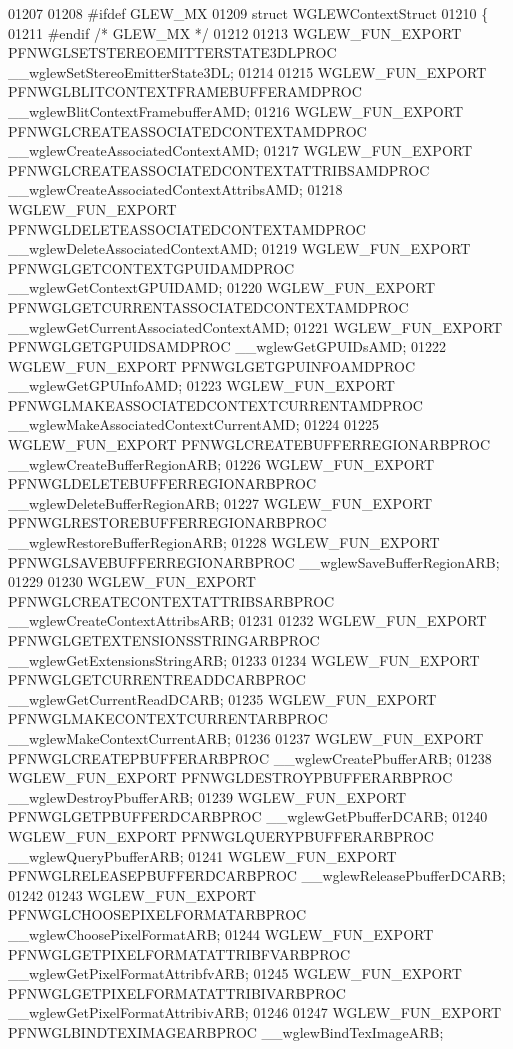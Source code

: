 \begin{DoxyCode}
01207 
01208 \textcolor{preprocessor}{#ifdef GLEW\_MX}
01209 \textcolor{keyword}{struct }WGLEWContextStruct
01210 \{
01211 \textcolor{preprocessor}{#endif }\textcolor{comment}{/* GLEW\_MX */}\textcolor{preprocessor}{}
01212 
01213 WGLEW_FUN_EXPORT PFNWGLSETSTEREOEMITTERSTATE3DLPROC 
      __wglewSetStereoEmitterState3DL;
01214 
01215 WGLEW_FUN_EXPORT PFNWGLBLITCONTEXTFRAMEBUFFERAMDPROC 
      __wglewBlitContextFramebufferAMD;
01216 WGLEW_FUN_EXPORT PFNWGLCREATEASSOCIATEDCONTEXTAMDPROC 
      __wglewCreateAssociatedContextAMD;
01217 WGLEW_FUN_EXPORT PFNWGLCREATEASSOCIATEDCONTEXTATTRIBSAMDPROC 
      __wglewCreateAssociatedContextAttribsAMD;
01218 WGLEW_FUN_EXPORT PFNWGLDELETEASSOCIATEDCONTEXTAMDPROC 
      __wglewDeleteAssociatedContextAMD;
01219 WGLEW_FUN_EXPORT PFNWGLGETCONTEXTGPUIDAMDPROC __wglewGetContextGPUIDAMD;
01220 WGLEW_FUN_EXPORT PFNWGLGETCURRENTASSOCIATEDCONTEXTAMDPROC 
      __wglewGetCurrentAssociatedContextAMD;
01221 WGLEW_FUN_EXPORT PFNWGLGETGPUIDSAMDPROC __wglewGetGPUIDsAMD;
01222 WGLEW_FUN_EXPORT PFNWGLGETGPUINFOAMDPROC __wglewGetGPUInfoAMD;
01223 WGLEW_FUN_EXPORT PFNWGLMAKEASSOCIATEDCONTEXTCURRENTAMDPROC 
      __wglewMakeAssociatedContextCurrentAMD;
01224 
01225 WGLEW_FUN_EXPORT PFNWGLCREATEBUFFERREGIONARBPROC __wglewCreateBufferRegionARB;
01226 WGLEW_FUN_EXPORT PFNWGLDELETEBUFFERREGIONARBPROC __wglewDeleteBufferRegionARB;
01227 WGLEW_FUN_EXPORT PFNWGLRESTOREBUFFERREGIONARBPROC __wglewRestoreBufferRegionARB;
01228 WGLEW_FUN_EXPORT PFNWGLSAVEBUFFERREGIONARBPROC __wglewSaveBufferRegionARB;
01229 
01230 WGLEW_FUN_EXPORT PFNWGLCREATECONTEXTATTRIBSARBPROC 
      __wglewCreateContextAttribsARB;
01231 
01232 WGLEW_FUN_EXPORT PFNWGLGETEXTENSIONSSTRINGARBPROC __wglewGetExtensionsStringARB;
01233 
01234 WGLEW_FUN_EXPORT PFNWGLGETCURRENTREADDCARBPROC __wglewGetCurrentReadDCARB;
01235 WGLEW_FUN_EXPORT PFNWGLMAKECONTEXTCURRENTARBPROC __wglewMakeContextCurrentARB;
01236 
01237 WGLEW_FUN_EXPORT PFNWGLCREATEPBUFFERARBPROC __wglewCreatePbufferARB;
01238 WGLEW_FUN_EXPORT PFNWGLDESTROYPBUFFERARBPROC __wglewDestroyPbufferARB;
01239 WGLEW_FUN_EXPORT PFNWGLGETPBUFFERDCARBPROC __wglewGetPbufferDCARB;
01240 WGLEW_FUN_EXPORT PFNWGLQUERYPBUFFERARBPROC __wglewQueryPbufferARB;
01241 WGLEW_FUN_EXPORT PFNWGLRELEASEPBUFFERDCARBPROC __wglewReleasePbufferDCARB;
01242 
01243 WGLEW_FUN_EXPORT PFNWGLCHOOSEPIXELFORMATARBPROC __wglewChoosePixelFormatARB;
01244 WGLEW_FUN_EXPORT PFNWGLGETPIXELFORMATATTRIBFVARBPROC 
      __wglewGetPixelFormatAttribfvARB;
01245 WGLEW_FUN_EXPORT PFNWGLGETPIXELFORMATATTRIBIVARBPROC 
      __wglewGetPixelFormatAttribivARB;
01246 
01247 WGLEW_FUN_EXPORT PFNWGLBINDTEXIMAGEARBPROC __wglewBindTexImageARB;

\end{DoxyCode}
